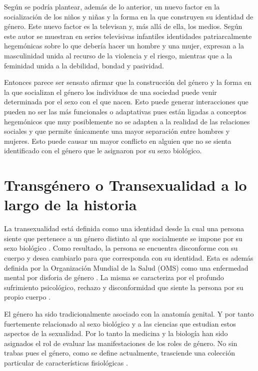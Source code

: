 Según \textcite{Anton2001} se podría plantear, además de lo anterior, un nuevo
factor en la socialización de los niños y niñas y la forma en la que construyen
su identidad de género. Este nuevo factor es la televisan y, más allá de ella,
los medios. Según este autor se muestran en series televisivas infantiles
identidades patriarcalmente hegemónicas sobre lo que debería hacer un hombre y
una mujer, expresan a la masculinidad unida al recurso de la violencia y el
riesgo, mientras que a la feminidad unida a la debilidad, bondad y pasividad.

Entonces parece ser
sensato afirmar que la construcción del género y la forma en la que socializan
el género los individuos de una sociedad puede venir determinada por el sexo con
el que nacen. Esto puede generar interacciones que pueden no ser las más
funcionales o adaptativas pues están ligadas a conceptos hegemónicos que muy
posiblemente no se adapten a la realidad de las relaciones sociales y que
permite únicamente una mayor separación entre hombres y mujeres. Esto puede causar
un mayor conflicto en alguien que no se sienta identificado con el género que le
asignaron por su sexo biológico.

\section{Transgénero o Transexualidad a lo largo de la historia}

La transexualidad está definida como una identidad desde la cual una persona
siente que pertenece a un género distinto al que socialmente se impone por su
sexo biológico \parencite{Helfrich2001}. Como resultado, la persona se encuentra
disconforme con su cuerpo y desea cambiarlo para que corresponda con su
identidad. Esta es además definida por la Organización Mundial de la Salud (OMS)
como una enfermedad mental por disforia de género \parencite{BergeroMiguel2008}.
La misma se caracteriza por el profundo sufrimiento psicológico, rechazo y
disconformidad que siente la persona por su propio cuerpo \parencite{APA}.

El género ha sido tradicionalmente asociado con la anatomía genital. Y por tanto
fuertemente relacionado al sexo biológico y a las ciencias que estudian estos
aspectos de la sexualidad. Por lo tanto la medicina y la biología han sido
asignados el rol de evaluar las manifestaciones de los roles de género. No sin
trabas pues el género, como se define actualmente, trasciende una colección
particular de características fisiológicas \parencite{Butler2001}.

